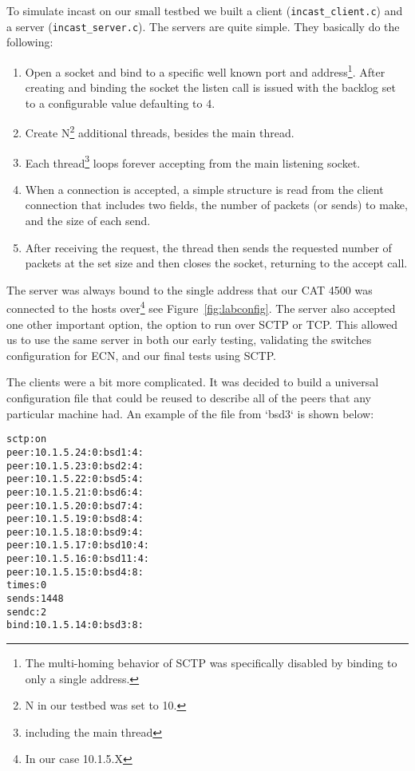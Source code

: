 \documentclass[12pt]{article}
\begin{document}
To simulate incast on our small testbed we built a client (\texttt{incast\_client.c}) and a server (\texttt{incast\_server.c}).
The servers are quite simple. They basically do the following:
\begin{enumerate}

\item Open a socket and bind to a specific well known port and address\footnote{The multi-homing
behavior of SCTP was specifically disabled by binding to only a single address.}. After creating and
binding the socket the listen call is issued with the backlog set to a configurable value defaulting to 4.

\item Create N\footnote{N in our testbed was set to 10.} additional threads, besides the main thread.

\item Each thread\footnote{including the main thread} loops forever accepting from the main listening socket.

\item When a connection is accepted, a simple structure is read from the client connection that includes two fields, the
number of packets (or sends) to make, and the size of each send.

\item After receiving the request, the thread then sends the requested number of packets at the set
size and then closes the socket, returning to the accept call.

\end{enumerate}

The server
was always bound to the single address that our CAT 4500 was connected to the hosts over\footnote{In our case 10.1.5.X}
see Figure~\ref{fig:labconfig}.
The server also accepted one other important option, the option to run over SCTP or TCP. This allowed us to use
the same server in both our early testing, validating the switches configuration for ECN, and our final tests
using SCTP.

The clients were a bit more complicated. It was decided to build a universal 
configuration file that could be reused to describe all of the peers that any
particular machine had. An example of the file from `bsd3` is shown below:
\begin{verbatim}
sctp:on
peer:10.1.5.24:0:bsd1:4:
peer:10.1.5.23:0:bsd2:4:
peer:10.1.5.22:0:bsd5:4:
peer:10.1.5.21:0:bsd6:4:
peer:10.1.5.20:0:bsd7:4:
peer:10.1.5.19:0:bsd8:4:
peer:10.1.5.18:0:bsd9:4:
peer:10.1.5.17:0:bsd10:4:
peer:10.1.5.16:0:bsd11:4:
peer:10.1.5.15:0:bsd4:8:
times:0
sends:1448
sendc:2
bind:10.1.5.14:0:bsd3:8:
\end{verbatim}
\end{document}
